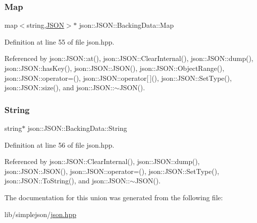 \subsubsection{\texorpdfstring{Map}{Map}}
{\footnotesize\ttfamily map$<$string,\mbox{\hyperlink{classjson_1_1_j_s_o_n}{J\+S\+ON}}$>$$\ast$ json\+::\+J\+S\+O\+N\+::\+Backing\+Data\+::\+Map}



Definition at line 55 of file json.\+hpp.



Referenced by json\+::\+J\+S\+O\+N\+::at(), json\+::\+J\+S\+O\+N\+::\+Clear\+Internal(), json\+::\+J\+S\+O\+N\+::dump(), json\+::\+J\+S\+O\+N\+::has\+Key(), json\+::\+J\+S\+O\+N\+::\+J\+S\+O\+N(), json\+::\+J\+S\+O\+N\+::\+Object\+Range(), json\+::\+J\+S\+O\+N\+::operator=(), json\+::\+J\+S\+O\+N\+::operator\mbox{[}$\,$\mbox{]}(), json\+::\+J\+S\+O\+N\+::\+Set\+Type(), json\+::\+J\+S\+O\+N\+::size(), and json\+::\+J\+S\+O\+N\+::$\sim$\+J\+S\+O\+N().

\mbox{\label{unionjson_1_1_j_s_o_n_1_1_backing_data_a883c18d113d2e55767a9530f06a9c772}} 
\subsubsection{\texorpdfstring{String}{String}}
{\footnotesize\ttfamily string$\ast$ json\+::\+J\+S\+O\+N\+::\+Backing\+Data\+::\+String}



Definition at line 56 of file json.\+hpp.



Referenced by json\+::\+J\+S\+O\+N\+::\+Clear\+Internal(), json\+::\+J\+S\+O\+N\+::dump(), json\+::\+J\+S\+O\+N\+::\+J\+S\+O\+N(), json\+::\+J\+S\+O\+N\+::operator=(), json\+::\+J\+S\+O\+N\+::\+Set\+Type(), json\+::\+J\+S\+O\+N\+::\+To\+String(), and json\+::\+J\+S\+O\+N\+::$\sim$\+J\+S\+O\+N().



The documentation for this union was generated from the following file\+:\begin{DoxyCompactItemize}
\item 
lib/simplejson/\mbox{\hyperlink{lib_2simplejson_2json_8hpp}{json.\+hpp}}\end{DoxyCompactItemize}
